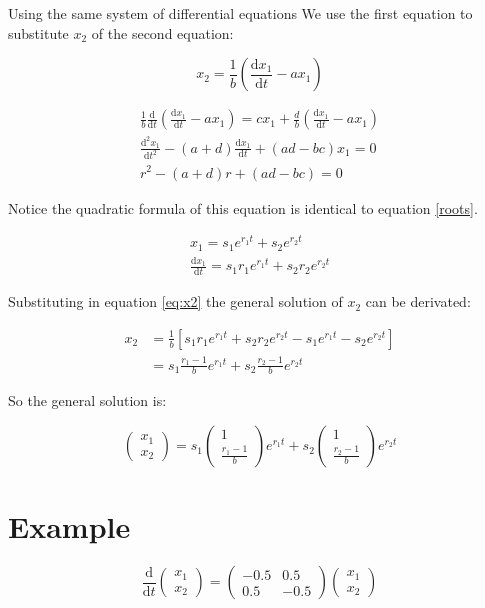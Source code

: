 \documentclass[12pt,letterpaper]{article}
\newcommand{\vectors}[2]{
	\begin{pmatrix}
		#1 \\ #2
	\end{pmatrix}
}
\newcommand{\smatrix}[4]{
	\begin{pmatrix}
		#1 & #2 \\ #3 & #4
	\end{pmatrix}
}
\begin{document}
		Using the same system of differential equations We use the first equation to substitute $x_2$ of the second equation:

		\begin{equation}
			x_2 = \frac{1}{b} \left( \frac{\mathrm{d}x_1}{\mathrm{d}t} - ax_1 \right)	
		\end{equation}
		\label{eq:x2}

		\begin{align*}
			\frac{1}{b} \frac{\mathrm{d}}{\mathrm{d}t} \left( \frac{\mathrm{d}x_1}{\mathrm{d}t} - ax_1 \right) = cx_1 + \frac{d}{b} \left( \frac{\mathrm{d}x_1}{\mathrm{d}t} - ax_1 \right) \\
			\frac{\mathrm{d}^2 x_1}{\mathrm{d}t^2} - (a+d) \frac{\mathrm{d}x_1}{\mathrm{d}t} + (ad-bc)x_1 = 0 \\
			r^2 -(a+d) r + (ad-bc) =0
		\end{align*}

		Notice the quadratic formula of this equation is identical to equation \ref{roots}.  

		\begin{align*}
			x_1 = s_1 e^{r_1 t} + s_2 e^{r_2 t} \\
			\frac{\mathrm{d}x_1}{\mathrm{d}t} = s_1 r_1 e^{r_1 t} + s_2 r_2 e^{r_2 t}
		\end{align*}

		Substituting in equation \ref{eq:x2}    the general solution of $x_2$ can be derivated:

		\begin{align*}
			x_2 &= \frac{1}{b} \left[ s_1 r_1 e^{r_1 t} + s_2 r_2 e^{r_2 t} - s_1 e^{r_1 t} - s_2 e^{r_2 t}\right] \\
			&= s_1 \frac{r_1 - 1}{b} e^{r_1 t} + s_2 \frac{r_2 - 1}{b} e^{r_2 t}
		\end{align*}

		So the general solution is:

		\begin{equation}
			\vectors{x_1}{x_2} = s_1 \vectors{1}{\frac{r_1 - 1}{b}} e^{r_1 t} +s_2 \vectors{1}{\frac{r_2 - 1}{b}} e^{r_2 t}
		\end{equation}

	\section{Example}

		\begin{equation}
			\frac{\mathrm{d}}{\mathrm{d}t} \vectors{x_1}{x_2} = \smatrix{-0.5}{0.5}{0.5}{-0.5} \vectors{x_1}{x_2}
		\end{equation}
\end{document}
